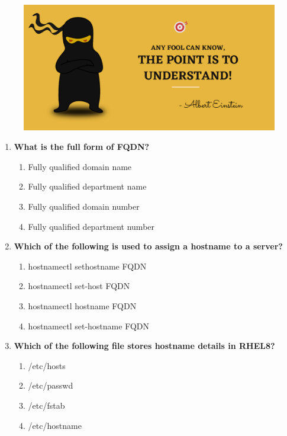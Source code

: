 \setlength{\columnsep}{3pt}
\begin{flushleft}
	
	\paragraph{}
	\bigskip
	
	\begin{figure}[h!]
		\centering
		\includegraphics[scale=.2]{content/practise.jpg}
	\end{figure}	
	\begin{enumerate}
		
		\item \textbf{What is the full form of FQDN?}
		\begin{enumerate}[label=(\alph*)]
			\item Fully qualified domain name  %
			\item Fully qualified department name
			\item Fully qualified domain number
			\item Fully qualified department number
		\end{enumerate}
		\bigskip
		\bigskip
		
		\item \textbf{Which of the following is used to assign a hostname to a server?}
		\begin{enumerate}[label=(\alph*)]
			\item hostnamectl sethostname FQDN
			\item hostnamectl set-host FQDN
			\item hostnamectl hostname FQDN
			\item hostnamectl set-hostname FQDN  %
		\end{enumerate}
		\bigskip
		\bigskip	
		
		\item \textbf{Which of the following file stores hostname details in RHEL8?}
		\begin{enumerate}[label=(\alph*)]
			\item /etc/hosts
			\item /etc/passwd
			\item /etc/fstab   
			\item /etc/hostname  %
		\end{enumerate}
		\bigskip
		\bigskip
			

\end{enumerate}
\end{flushleft}
